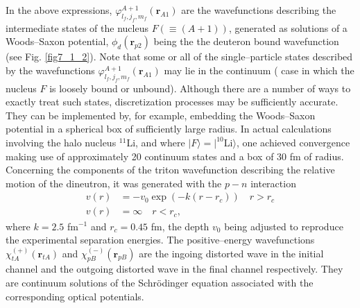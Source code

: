 In the above expressions, $\varphi^{A+1}_{l_f,j_f,m_f}(\mathbf r_{A1})$ are the wavefunctions describing the intermediate states of the nucleus $F(\equiv (A+1))$, generated as solutions of a Woods--Saxon potential,  $\phi_d(\mathbf r_{p2})$ being the  the deuteron bound wavefunction (see Fig. \ref{fig7_1_2}). Note that some or all of the single--particle states described by the wavefunctions $\varphi^{A+1}_{l_f,j_f,m_f}(\mathbf r_{A1})$ may lie in the continuum ( case in which the nucleus $F$ is loosely bound or unbound). Although there are a number of ways to exactly treat such states, discretization processes may be sufficiently	accurate. They can be implemented by, for example,  embedding the Woods--Saxon potential in a spherical box of sufficiently large  radius. In actual calculations involving the halo nucleus $^{11}$Li, and where $|F\rangle=|^{10}$Li$\rangle$, one achieved convergence making use of approximately  20 continuum states and a box of 30 fm of radius. Concerning the components of the triton wavefunction describing the relative motion of the dineutron, it was  generated with the $p-n$ interaction \citep{Tang:65}
\begin{align}\label{eq7_1_6}
v(r)&=-v_0\exp\left(-k(r-r_c)\right) \quad r>r_c\\
v(r)&=\infty \quad r<r_c,
\end{align}
where $k=2.5$ fm$^{-1}$ and $r_c=0.45$ fm, the depth $v_0$ being adjusted to reproduce the experimental separation energies.
The positive--energy wavefunctions  $\chi^{(+)}_{tA}(\mathbf{r}_{tA})$ and $\chi^{(-)}_{pB}(\mathbf{r}_{pB})$ are the ingoing distorted wave in the initial channel and the outgoing distorted wave in the final channel respectively. They are continuum solutions of the Schr\"{o}dinger equation associated with the corresponding optical potentials.


